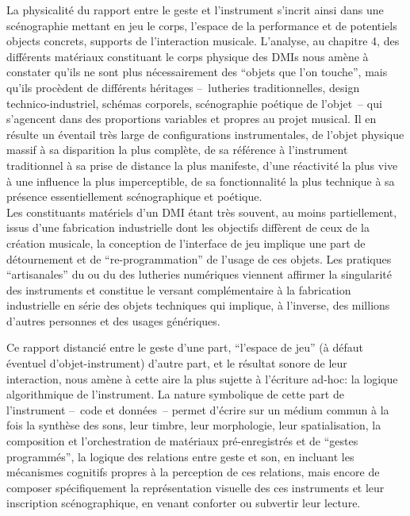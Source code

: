
\noindent La physicalité du rapport entre le geste et l'instrument s'incrit ainsi dans une scénographie mettant en jeu le corps, l'espace de la performance et de potentiels objects concrets, supports de l'interaction musicale. L'analyse, au chapitre 4, des différents matériaux constituant le corps physique des \glspl{DMI} nous amène à constater qu'ils ne sont plus nécessairement des ``objets que l'on touche'', mais qu'ils procèdent de différents héritages --~lutheries traditionnelles, design technico-industriel, schémas corporels, scénographie poétique de l'objet~-- qui s'agencent dans des proportions variables et propres au projet musical. Il en résulte un éventail très large de configurations instrumentales, de l'objet physique massif à sa disparition la plus complète, de sa référence à l'instrument traditionnel à sa prise de distance la plus manifeste, d'une réactivité la plus vive à une influence la plus imperceptible, de sa fonctionnalité la plus technique à sa présence essentiellement scénographique et poétique.\\
\indent Les constituants matériels d'un \gls{DMI} étant très souvent, au moins partiellement, issus d'une fabrication industrielle dont les objectifs diffèrent de ceux de la création musicale, la conception de l'interface de jeu implique une part de détournement et de ``re-programmation'' de l'usage de ces objets. Les pratiques ``artisanales'' du  ou du  des lutheries numériques viennent affirmer la singularité des instruments et constitue le versant complémentaire à la fabrication industrielle en série des objets techniques qui implique, à l'inverse, des millions d'autres personnes et des usages génériques.





Ce rapport distancié entre le geste d'une part, ``l'espace de jeu'' (à défaut éventuel d'objet-instrument) d'autre part, et le résultat sonore de leur interaction, nous amène à cette aire la plus sujette à l'écriture ad-hoc: la logique algorithmique de l'instrument. La nature symbolique de cette part de l'instrument --~code et données~-- permet d'écrire sur un médium commun à la fois la synthèse des sons, leur timbre, leur morphologie, leur spatialisation, la composition et l'orchestration de matériaux pré-enregistrés et de ``gestes programmés'', la logique des relations entre geste et son, en incluant les mécanismes cognitifs propres à la perception de ces relations, mais encore de composer spécifiquement la représentation visuelle des ces instruments et leur inscription scénographique, en venant conforter ou subvertir leur lecture.

